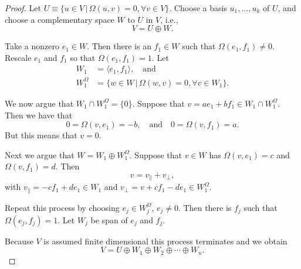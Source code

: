 \documentclass[prl,twocolumn,lengthcheck,superscriptaddress]{revtex4-1}
\theoremstyle{definition}
\theoremstyle{remark}
\begin{document}
\begin{proof}
	Let $U \equiv \{u\in V\,|\, \Omega(u,v) = 0, \forall v\in V\}$. Choose a basis $u_1, \ldots, u_k$ of $U$, and choose a complementary space $W$ to $U$ in $V$, i.e., 
	\begin{equation}
		V = U\oplus W.
	\end{equation}
		
	Take a nonzero $e_1\in W$. Then there is an $f_1\in W$ such that $\Omega(e_1, f_1) \not= 0$. Rescale $e_1$ and $f_1$ so that $\Omega(e_1,f_1) = 1$. Let 
	\begin{equation}
		\begin{split}
			W_1 &= \langle e_1, f_1 \rangle, \quad \text{and} \\
			W_1^{\Omega} &= \{w\in W\,|\, \Omega(w, v) = 0, \forall v\in W_1\}.
		\end{split}
	\end{equation}

We now argue that $W_1\cap W_1^{\Omega}= \{0\}$. Suppose that $v = ae_1 + bf_1 \in W_1\cap W_1^{\Omega}$. Then we have that
\begin{equation}
	0 = \Omega(v,e_1) = -b, \quad \text{and} \quad 0 = \Omega(v, f_1) = a.
\end{equation}
But this means that $v=0$.

Next we argue that $W = W_1\oplus W_1^{\Omega}$. Suppose that $v\in W$ has $\Omega(v, e_1) = c$ and $\Omega(v, f_1)= d$. Then
\begin{equation}
	v = v_{\|} + v_{\perp},
\end{equation}
with $v_{\|} = -cf_1 + d e_1 \in W_1$ and $v_{\perp} = v+cf_1-de_1 \in W_1^\Omega$.

Repeat this process by choosing $e_j\in W_j^\Omega$, $e_j\not=0$. Then there is $f_j$ such that $\Omega(e_j,f_j) = 1$. Let $W_j$ be span of $e_j$ and $f_j$.

Because $V$ is assumed finite dimensional this process terminates and we obtain
\begin{equation}
	V = U\oplus W_1\oplus W_2 \oplus \cdots \oplus W_n.
\end{equation}
\end{proof}
\end{document}
